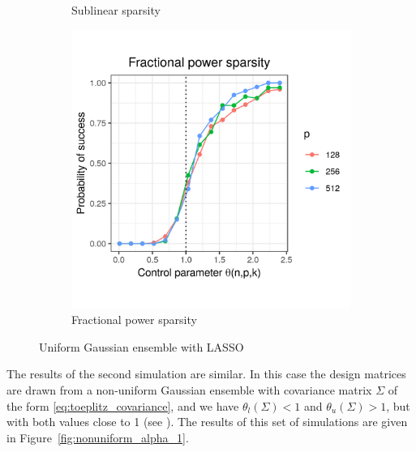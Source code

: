 \documentclass[letterpaper,12pt]{article}
\begin{document}
\begin{figure}[h]
\begin{subfigure}{0.32\textwidth}
    \caption{Sublinear sparsity}
    \label{fig:uniform_sublinear_sparsity_alpha_1}
  \end{subfigure}
  \begin{subfigure}{0.32\textwidth}
    \includegraphics[width=0.9\linewidth]{uniform_fractional_power_sparsity_alpha_1}
    \caption{Fractional power sparsity}
    \label{fig:uniform_fractional_power_sparsity_alpha_1}
  \end{subfigure}
  \caption{Uniform Gaussian ensemble with LASSO}
  \label{fig:uniform_alpha_1}
\end{figure}

The results of the second simulation are similar. In this case the
design matrices are drawn from a non-uniform Gaussian ensemble with
covariance matrix $\Sigma$ of the form \eqref{eq:toeplitz_covariance},
and we have $\theta_l(\Sigma) < 1$ and $\theta_u(\Sigma) > 1$, but
with both values close to 1 (see \cite{wainwright06}). The results of
this set of simulations are given in
Figure~\ref{fig:nonuniform_alpha_1}.
\end{document}
